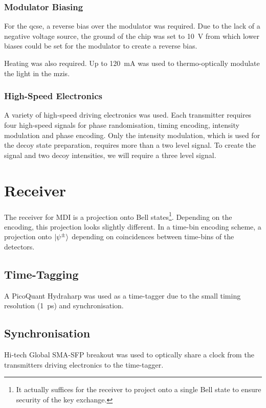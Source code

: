 \subsubsection*{Modulator Biasing}

For the \ac{qcse}, a reverse bias over the modulator was required. Due to the lack of a negative voltage source, the ground of the chip was set to \SI{10}{V} from which lower biases could be set for the modulator to create a reverse bias.

Heating was also required. Up to \SI{120}{mA} was used to thermo-optically modulate the light in the \acp{mzi}.

\subsubsection*{High-Speed Electronics}

A variety of high-speed driving electronics was used. Each transmitter requires four high-speed signals for phase randomisation, timing encoding, intensity modulation and phase encoding. Only the intensity modulation, which is used for the decoy state preparation, requires more than a two level signal. To create the signal and two decoy intensities, we will require a three level signal. 

\section{Receiver}

The receiver for \ac{MDI} is a projection onto Bell states\footnote{It actually suffices for the receiver to project onto a single Bell state to ensure security of the key exchange.}. Depending on the encoding, this projection looks slightly different. In a time-bin encoding scheme, a projection onto $\ket{\psi^\pm}$ depending on coincidences between time-bins of the detectors.

\subsection{Time-Tagging}

A PicoQuant Hydraharp was used as a time-tagger due to the small timing resolution (\SI{1}{ps}) and synchronisation.

\subsection{Synchronisation}

Hi-tech Global SMA-SFP breakout was used to optically share a clock from the transmitters driving electronics to the time-tagger. 

